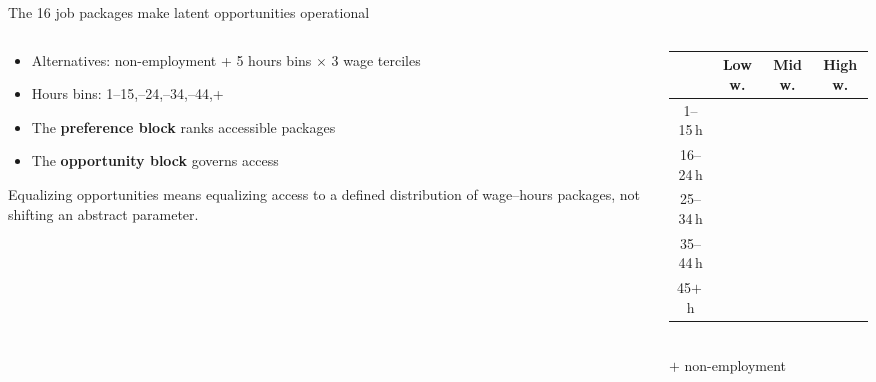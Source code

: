 \documentclass[aspectratio=169,11pt]{beamer}
\begin{document}
\begin{frame}{The 16 job packages make latent opportunities operational}

\begin{columns}[T]
\begin{column}{0.55\textwidth}
\begin{itemize}
\item Alternatives: non-employment + 5 hours bins $\times$ 3 wage terciles
\item Hours bins: 1--15,--24,--34,--44,+
\item The \textbf{preference block} ranks accessible packages
\item The \textbf{opportunity block} governs access
\end{itemize}

\medskip
\scriptsize\textcolor{cgrey}{Equalizing opportunities means equalizing access to a defined distribution of wage--hours packages, not shifting an abstract parameter.}
\end{column}
\begin{column}{0.42\textwidth}
\centering
\footnotesize
\begin{tabular}{@{}c|ccc@{}}
\toprule
 & Low w. & Mid w. & High w. \\
\midrule
1--15\,h   & \cellcolor{cblue!6}  & \cellcolor{cblue!6}  & \cellcolor{cblue!6}  \\
16--24\,h  & \cellcolor{cblue!8}  & \cellcolor{cblue!8}  & \cellcolor{cblue!8}  \\
25--34\,h  & \cellcolor{cblue!12} & \cellcolor{cblue!12} & \cellcolor{cblue!12} \\
35--44\,h  & \cellcolor{cblue!18} & \cellcolor{cblue!18} & \cellcolor{cblue!18} \\
45$+$\,h   & \cellcolor{cblue!8}  & \cellcolor{cblue!8}  & \cellcolor{cblue!8}  \\
\bottomrule
\end{tabular}
\\[4pt]
\scriptsize $+$\; non-employment\\[6pt]
\end{column}
\end{columns}
\end{frame}
\end{document}
